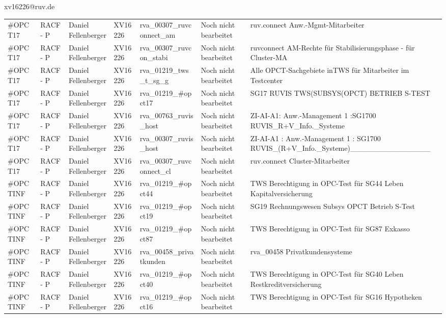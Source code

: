 \documentclass[a4paper,landscape,12pt]{letter}
\begin{document}
\begin{letter}{xv16226@ruv.de\hfill \break}
\begin{tiny}
\begin{longtable}{|p{35mm}|p{15mm}|p{25mm}|p{10mm}|p{40mm}|p{50mm}|p{50mm}|}
\#OPCT17 & RACF - P & Daniel Fellenberger & XV16226 & rva\_00307\_ruvconnect\_am & Noch nicht bearbeitet & ruv.connect Anw.-Mgmt-Mitarbeiter \\
\#OPCT17 & RACF - P & Daniel Fellenberger & XV16226 & rva\_00307\_ruvcon\_stabi & Noch nicht bearbeitet & ruvconnect AM-Rechte für Stabilisierungsphase - für Cluster-MA \\
\#OPCT17 & RACF - P & Daniel Fellenberger & XV16226 & rva\_01219\_tws\_t\_sg\_g & Noch nicht bearbeitet & Alle OPCT-Sachgebiete inTWS für Mitarbeiter im Testcenter \\
\#OPCT17 & RACF - P & Daniel Fellenberger & XV16226 & rva\_01219\_\#opct17 & Noch nicht bearbeitet & SG17 RUVIS TWS(SUBSYS(OPCT) BETRIEB S-TEST \\
\#OPCT17 & RACF - P & Daniel Fellenberger & XV16226 & rva\_00763\_ruvis\_host & Noch nicht bearbeitet & ZI-AI-A1: Anw.-Management 1 :SG1700 RUVIS\_R+V\_Info.\_Systeme \\
\#OPCT17 & RACF - P & Daniel Fellenberger & XV16226 & rva\_00307\_ruvis\_host & Noch nicht bearbeitet & ZI-AI-A1   : Anw.-Management 1 : SG1700 RUVIS\_(R+V\_Info.\_Systeme)\_\_\_\_\_\_\_\_\_\_\_\_\_\_\_ \\
\#OPCT17 & RACF - P & Daniel Fellenberger & XV16226 & rva\_00307\_ruvconnect\_cl & Noch nicht bearbeitet & ruv.connect Cluster-Mitarbeiter \\
\#OPCTINF & RACF - P & Daniel Fellenberger & XV16226 & rva\_01219\_\#opct44 & Noch nicht bearbeitet & TWS Berechtigung in OPC-Test für SG44 Leben Kapitalversicherung \\
\#OPCTINF & RACF - P & Daniel Fellenberger & XV16226 & rva\_01219\_\#opct19 & Noch nicht bearbeitet & SG19 Rechnungswesen Subsys OPCT Betrieb S-Test \\
\#OPCTINF & RACF - P & Daniel Fellenberger & XV16226 & rva\_01219\_\#opct87 & Noch nicht bearbeitet & TWS Berechtigung in OPC-Test für SG87 Exkasso \\
\#OPCTINF & RACF - P & Daniel Fellenberger & XV16226 & rva\_00458\_privatkunden & Noch nicht bearbeitet & rva\_00458 Privatkundensysteme \\
\#OPCTINF & RACF - P & Daniel Fellenberger & XV16226 & rva\_01219\_\#opct40 & Noch nicht bearbeitet & TWS Berechtigung in OPC-Test für SG40 Leben Restkreditversicherung \\
\#OPCTINF & RACF - P & Daniel Fellenberger & XV16226 & rva\_01219\_\#opct16 & Noch nicht bearbeitet & TWS Berechtigung in OPC-Test für SG16 Hypotheken \\

\end{longtable}
\end{tiny}
\end{letter}
\end{document}
